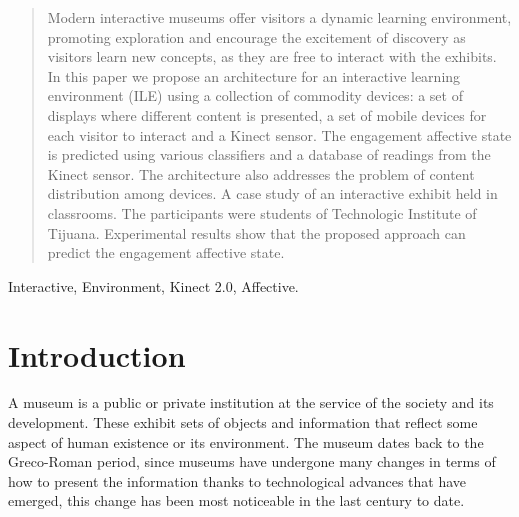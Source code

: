 \documentclass[journal]{IEEEtran}
\begin{document}
\begin{abstract}
\boldmath
Modern interactive museums offer visitors a dynamic learning environment, promoting exploration and encourage the excitement of discovery as visitors learn new concepts, as they are free to interact with the exhibits. In this paper we propose an architecture for an interactive learning environment (ILE) using a collection of commodity devices: a set of displays where different content is presented, a set of mobile devices for each visitor to interact and a Kinect sensor. The engagement affective state is predicted using various classifiers and a database of readings from the Kinect sensor. The architecture also addresses the problem of content distribution among devices.  A case study of an interactive exhibit held in classrooms. The participants were students of Technologic Institute of Tijuana. Experimental results show that the proposed approach can predict the engagement affective state.

\end{abstract}

\begin{IEEEkeywords}
Interactive, Environment, Kinect 2.0, Affective.
\end{IEEEkeywords}






%
\IEEEpeerreviewmaketitle



\section{Introduction}


A museum is a public or private institution at the service of the society and its development. These exhibit sets of objects and information that reflect some aspect of human existence or its environment. The museum dates back to the Greco-Roman period, since museums have undergone many changes in terms of how to present the information thanks to technological advances that have emerged, this change has been most noticeable in the last century to date.
\end{document}
